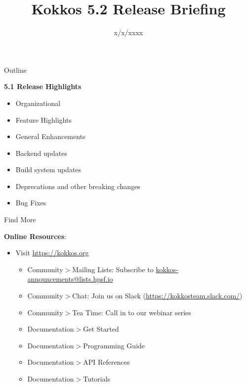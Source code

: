 
\usepackage{tikz}
\graphicspath{{5_2/figures/}}
\usepackage{multicol}
\usepackage{pgfplots}
\usepackage{xfrac}


\def\ornlid{THIS WILL NEED TO BE UPDATED AFTER RESOLUTION}

\title{Kokkos 5.2 Release Briefing}


\date{x/x/xxxx}





\begin{frame}
  \titlepage
\end{frame}


\begin{frame}[fragile]{Outline}

  \textbf{5.1 Release Highlights}

  \begin{itemize}
    \item{Organizational}
    \item{Feature Highlights}
    \item{General Enhancements}
    \item{Backend updates}
    \item{Build system updates}
    \item{Deprecations and other breaking changes}
    \item{Bug Fixes}
  \end{itemize}

\end{frame}

\begin{frame}{Find More}

  \textbf{Online Resources}:

  \begin{itemize}
  \item Visit \url{https://kokkos.org}
    \begin{itemize}
    \item Community$>$Mailing Lists: Subscribe to \url{kokkos-announcements@lists.hpsf.io}
    \item Community$>$Chat: Join us on Slack (\url{https://kokkosteam.slack.com/})
    \item Community$>$Tea Time: Call in to our webinar series
    \item Documentation$>$Get Started
    \item Documentation$>$Programming Guide
    \item Documentation$>$API References
    \item Documentation$>$Tutorials
    \end{itemize}
  \end{itemize}

\end{frame}


